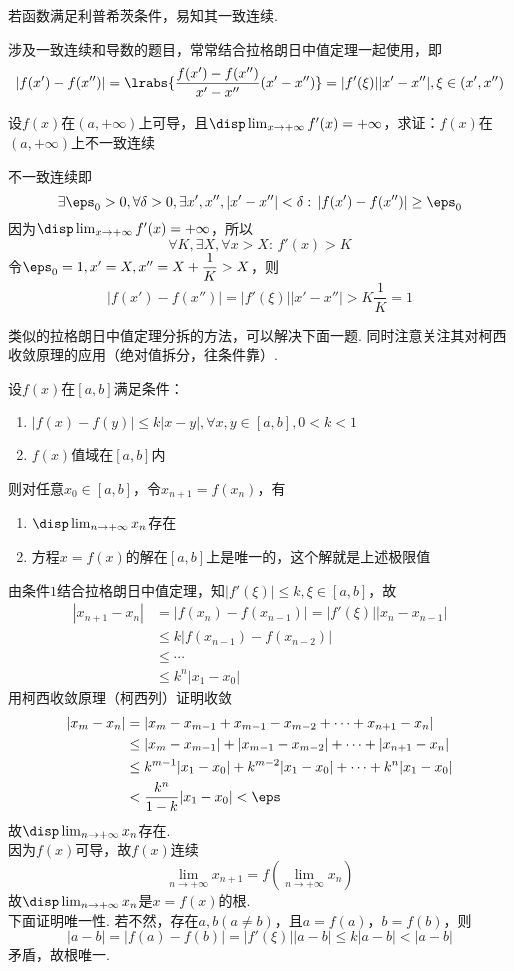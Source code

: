 \par 若函数满足利普希茨条件，易知其一致连续.
\par 涉及一致连续和导数的题目，常常结合拉格朗日中值定理一起使用，即
\[|f(x')-f(x'')|=\lrabs{\dfrac{f(x')-f(x'')}{x'-x''}(x'-x'')}=|f'(\xi)||x'-x''|,\xi\in(x',x'')\]
\begin{example}
设$f(x)$在$(a,+\infty)$上可导，且$\disp\lim_{x\to+\infty}f'(x)=+\infty$，求证：$f(x)$在$(a,+\infty)$上不一致连续
\end{example}
\begin{analysis}
不一致连续即
\[\exists \eps_0>0,\forall\delta>0,\exists x',x'',|x'-x''|<\delta:\,|f(x')-f(x'')|\geq\eps_0\]
因为$\disp\lim_{x\to+\infty}f'(x)=+\infty$，所以
\[\forall K,\exists X,\forall x>X:\,f'(x)>K\]
令$\eps_0=1,x'=X,x''=X+\dfrac{1}{K}>X$，则
\[|f(x')-f(x'')|=|f'(\xi)||x'-x''|>K\dfrac{1}{K}=1\]
\end{analysis}
\par 类似的拉格朗日中值定理分拆的方法，可以解决下面一题. 同时注意关注其对柯西收敛原理的应用（绝对值拆分，往条件靠）.
\begin{example}
设$f(x)$在$[a,b]$满足条件：
\begin{enumerate}
	\item $|f(x)-f(y)|\leq k|x-y|,\forall x,y\in[a,b],0<k<1$
	\item $f(x)$值域在$[a,b]$内
\end{enumerate}
则对任意$x_0\in[a,b]$，令$x_{n+1}=f(x_n)$，有
\begin{enumerate}
	\item $\disp\lim_{n\to+\infty}x_n$存在
	\item 方程$x=f(x)$的解在$[a,b]$上是唯一的，这个解就是上述极限值
\end{enumerate}
\end{example}
\begin{analysis}
由条件$1$结合拉格朗日中值定理，知$|f'(\xi)|\leq k,\xi\in[a,b]$，故
\[\begin{aligned}
|x_{n+1}-x_n|&=|f(x_n)-f(x_{n-1})|=|f'(\xi)||x_n-x_{n-1}|\\
&\leq k|f(x_{n-1})-f(x_{n-2})|\\
&\leq \cdots\\
&\leq k^n|x_1-x_0|
\end{aligned}\]
用柯西收敛原理（柯西列）证明收敛
\[\begin{aligned}
|x_m-x_n|&=|x_m-x_{m-1}+x_{m-1}-x_{m-2}+\cdots+x_{n+1}-x_n|\\
&\leq|x_m-x_{m-1}|+|x_{m-1}-x_{m-2}|+\cdots+|x_{n+1}-x_n|\\
&\leq k^{m-1}|x_1-x_0|+k^{m-2}|x_1-x_0|+\cdots+k^{n}|x_1-x_0|\\
&< \dfrac{k^n}{1-k}|x_1-x_0| < \eps
\end{aligned}\]
故$\disp\lim_{n\to+\infty}x_n$存在.\\
因为$f(x)$可导，故$f(x)$连续
\[\lim_{n\to+\infty}x_{n+1}=f(\lim_{n\to+\infty}x_n)\]
故$\disp\lim_{n\to+\infty}x_n$是$x=f(x)$的根.\\
下面证明唯一性. 若不然，存在$a,b(a\ne b)$，且$a=f(a)$，$b=f(b)$，则
\[|a-b|=|f(a)-f(b)|=|f'(\xi)||a-b|\leq k|a-b|<|a-b|\]
矛盾，故根唯一.
\end{analysis}